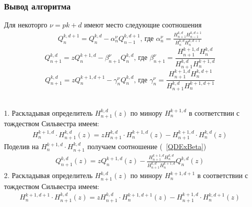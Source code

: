 \subsubsection{Вывод алгоритма}
\begin{teor}
Для некоторго $\nu=pk+d$ имеют место следующие соотношения
\begin{eqnarray}
\label{QDExAlpha} Q_n^{k,d+1}=Q_n^{k,d}-\alpha_n^{\nu}
Q_{n-1}^{k,d+1} \mbox{, где }
\alpha_n^{\nu}=\frac{H^{k,d}_{n+1}H_{n-1}^{k,d+1} }{H_{n}^{k,d}
H_{n}^{k,d+1}}
\end{eqnarray}
\begin{equation}
\label{QDExBeta} Q_{n+1}^{k,d} =zQ_n^{k+1,d}-\beta_{n+1}^{{\nu}}
Q_n^{k,d} \mbox{, где } \beta_{n+1}^{\nu}
=\frac{H^{k+1,d}_{n+1}H_{n}^{k,d} }{H_{n+1}^{k,d} H_{n}^{k+1,d}}
\end{equation}
\begin{equation}
\label{QDExGamma} Q_{n+1}^{k,d} =zQ_n^{k+1,d+1}-\gamma_{n}^{\nu}
Q_n^{k,d} \mbox{, где } \gamma_{n}^{\nu}=
\frac{H^{k+1,d}_{n+1}H_{n}^{k,d+1} }{H_{n+1}^{k,d}
H_{n}^{k+1,d+1}}
\end{equation}
\end{teor}
 \\
1. Раскладывая определитель $H_{n+1}^{k,d}(z)$ по минору
$H_{n}^{k+1,d}$ в соответствии с тождеством Сильвестра имеем:
\begin{eqnarray}
H_{n}^{k+1,d}\cdot H_{n+1}^{k,d} (z)=zH_{n+1}^{k,d}  \cdot
H_{n}^{k+1,d}(z) -H^{k+1,d}_{n+1} \cdot H_{n}^{k,d}  (z) \nonumber
\end{eqnarray}
Поделив на $H_{n}^{k+1,d}\cdot H_{n+1}^{k,d} $ получаем
соотношение (~\ref{QDExBeta})
\begin{eqnarray}
Q_{n+1}^{k,d} (z)=zQ_{n}^{k+1,d}(z)
-\frac{H^{k+1,d}_{n+1}H_{n}^{k,d} }{H_{n+1}^{k,d} H_{n}^{k+1,d}}
Q_{n}^{k,d}  (z) \nonumber
\end{eqnarray}
2. Раскладывая определитель $H_{n+1}^{k,d}(z)$ по минору
$H_{n}^{k+1,d+1}$ в соответствии с тождеством Сильвестра имеем:
\begin{eqnarray}
H_{n}^{k+1,d+1}\cdot H_{n+1}^{k,d} (z)=zH_{n+1}^{k,d}  \cdot
H_{n}^{k+1,d+1}(z) -H^{k+1,d}_{n+1} \cdot H_{n}^{k,d+1}  (z)
\nonumber
\end{eqnarray}
